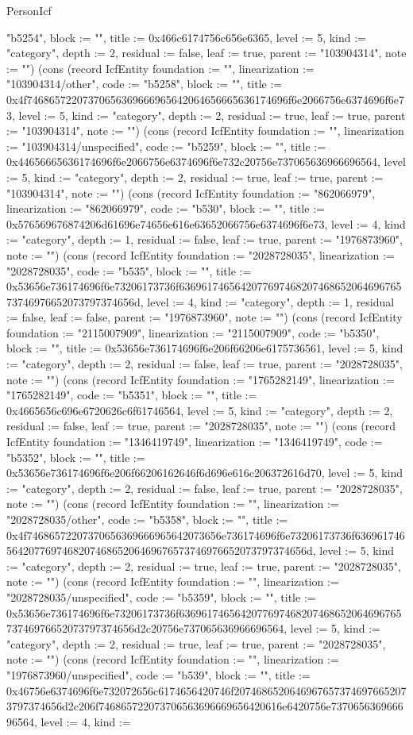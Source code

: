 \begin{lexlean}{PersonIcf}
\begin{semanticmodule}
{"b5254", block := "", title := 0x466c6174756c656e6365, level := 5, kind := "category", depth := 2, residual := false, leaf := true, parent := "103904314", note := ""}) (cons (record IcfEntity {foundation := "", linearization := "103904314/other", code := "b5258", block := "", title := 0x4f74686572207370656369666965642064656665636174696f6e2066756e6374696f6e73, level := 5, kind := "category", depth := 2, residual := true, leaf := true, parent := "103904314", note := ""}) (cons (record IcfEntity {foundation := "", linearization := "103904314/unspecified", code := "b5259", block := "", title := 0x44656665636174696f6e2066756e6374696f6e732c20756e737065636966696564, level := 5, kind := "category", depth := 2, residual := true, leaf := true, parent := "103904314", note := ""}) (cons (record IcfEntity {foundation := "862066979", linearization := "862066979", code := "b530", block := "", title := 0x576569676874206d61696e74656e616e63652066756e6374696f6e73, level := 4, kind := "category", depth := 1, residual := false, leaf := true, parent := "1976873960", note := ""}) (cons (record IcfEntity {foundation := "2028728035", linearization := "2028728035", code := "b535", block := "", title := 0x53656e736174696f6e73206173736f636961746564207769746820746865206469676573746976652073797374656d, level := 4, kind := "category", depth := 1, residual := false, leaf := false, parent := "1976873960", note := ""}) (cons (record IcfEntity {foundation := "2115007909", linearization := "2115007909", code := "b5350", block := "", title := 0x53656e736174696f6e206f66206e6175736561, level := 5, kind := "category", depth := 2, residual := false, leaf := true, parent := "2028728035", note := ""}) (cons (record IcfEntity {foundation := "1765282149", linearization := "1765282149", code := "b5351", block := "", title := 0x4665656c696e6720626c6f61746564, level := 5, kind := "category", depth := 2, residual := false, leaf := true, parent := "2028728035", note := ""}) (cons (record IcfEntity {foundation := "1346419749", linearization := "1346419749", code := "b5352", block := "", title := 0x53656e736174696f6e206f66206162646f6d696e616c206372616d70, level := 5, kind := "category", depth := 2, residual := false, leaf := true, parent := "2028728035", note := ""}) (cons (record IcfEntity {foundation := "", linearization := "2028728035/other", code := "b5358", block := "", title := 0x4f74686572207370656369666965642073656e736174696f6e73206173736f636961746564207769746820746865206469676573746976652073797374656d, level := 5, kind := "category", depth := 2, residual := true, leaf := true, parent := "2028728035", note := ""}) (cons (record IcfEntity {foundation := "", linearization := "2028728035/unspecified", code := "b5359", block := "", title := 0x53656e736174696f6e73206173736f636961746564207769746820746865206469676573746976652073797374656d2c20756e737065636966696564, level := 5, kind := "category", depth := 2, residual := true, leaf := true, parent := "2028728035", note := ""}) (cons (record IcfEntity {foundation := "", linearization := "1976873960/unspecified", code := "b539", block := "", title := 0x46756e6374696f6e732072656c6174656420746f20746865206469676573746976652073797374656d2c206f746865722073706563696669656420616e6420756e737065636966696564, level := 4, kind := }
\end{semanticmodule}
\end{lexlean}

